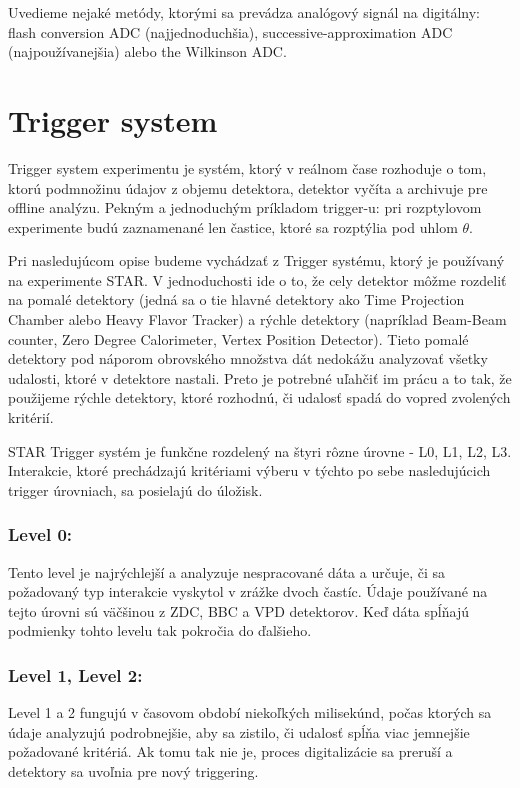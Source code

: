 \documentclass[../../main.tex]{subfiles}
\begin{document}
Uvedieme nejaké metódy, ktorými sa prevádza analógový signál na digitálny: flash conversion ADC (najjednoduchšia),  successive-approximation ADC (najpoužívanejšia) alebo the Wilkinson ADC.

\section{Trigger system }
Trigger system experimentu je systém, ktorý v reálnom čase rozhoduje o tom, ktorú podmnožinu údajov z objemu detektora, detektor vyčíta a archivuje pre offline analýzu. Pekným a jednoduchým príkladom trigger-u: pri rozptylovom experimente budú zaznamenané len častice, ktoré sa rozptýlia pod uhlom $\theta$.

Pri nasledujúcom opise budeme vychádzať z Trigger systému, ktorý je používaný na experimente STAR. V jednoduchosti ide o to, že cely detektor môžme rozdeliť na pomalé detektory (jedná sa o tie hlavné detektory ako Time Projection Chamber alebo Heavy Flavor Tracker) a rýchle detektory (napríklad Beam-Beam counter, Zero Degree Calorimeter, Vertex Position Detector). Tieto pomalé detektory pod náporom obrovského množstva dát nedokážu analyzovať všetky udalosti, ktoré v detektore nastali. Preto je potrebné uľahčiť im prácu a to tak, že použijeme rýchle detektory, ktoré rozhodnú, či udalosť spadá do vopred zvolených kritérií. 

STAR Trigger systém je funkčne rozdelený na štyri rôzne úrovne - L0, L1, L2, L3. Interakcie, ktoré prechádzajú kritériami výberu v týchto po sebe nasledujúcich trigger úrovniach, sa posielajú do úložisk.

\subsubsection{Level 0:}
Tento level je najrýchlejší a analyzuje nespracované dáta a určuje, či sa požadovaný typ interakcie vyskytol v zrážke dvoch častíc. Údaje používané na tejto úrovni sú väčšinou z ZDC, BBC a VPD detektorov. Keď dáta spĺňajú podmienky tohto levelu tak pokročia do ďalšieho.

\subsubsection{Level 1, Level 2:}
Level 1 a 2 fungujú v časovom období niekoľkých milisekúnd, počas ktorých sa údaje analyzujú podrobnejšie, aby sa zistilo, či udalosť spĺňa viac jemnejšie požadované kritériá. Ak tomu tak nie je, proces digitalizácie sa preruší a detektory sa uvoľnia pre nový triggering.
\end{document}
